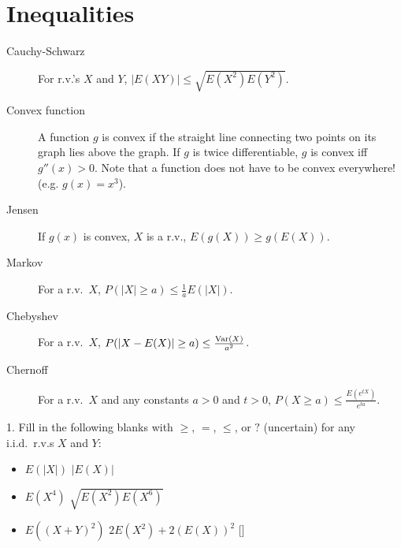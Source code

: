 \documentclass{article}
\begin{document}
 

\header

\section{Inequalities}

\begin{description}
\item[Cauchy-Schwarz] For r.v.'s $X$ and $Y$, $|E(XY)| \leq \sqrt{E(X^2)E(Y^2)}$. 

\item[Convex function] A function $g$ is convex if the straight line connecting two points on its graph lies above the graph. If $g$ is twice differentiable, $g$ is convex iff $g''(x) > 0$. Note that a function does not have to be convex everywhere! (e.g. $g(x) = x^3$). 

\item[Jensen] If $g(x)$ is convex, $X$ is a r.v., $E(g(X)) \geq g(E(X))$. 

\item[Markov] For a r.v.~$X$, $P(|X| \geq a) \leq \frac{1}{a}E(|X|)$.  

\item[Chebyshev] For a r.v.~$X$, $P(|X-E(X)| \geq a) \leq \frac{\textrm{Var}(X)}{a^2}$. 

\item[Chernoff] For a r.v.~$X$ and any constants $a>0$ and $t>0$, $P(X \geq a) \leq \frac{E(e^{tX})}{e^{ta}}$. 

\end{description}
1. Fill in the following blanks with $\geq$, $=$, $\leq$, or $?$ (uncertain) for any i.i.d.~r.v.s $X$ and $Y$:
\begin{itemize}
\item $E(|X|)$ \underline{\hspace{1cm}} $|E(X)|$


\item $E(X^4)$ \underline{\hspace{1cm}} $\sqrt{E(X^2)E(X^6)}$


\item $E((X+Y)^2)$ \underline{\hspace{1cm}} $2E(X^2) + 2(E(X))^2$ []


\end{itemize}
\end{document}
